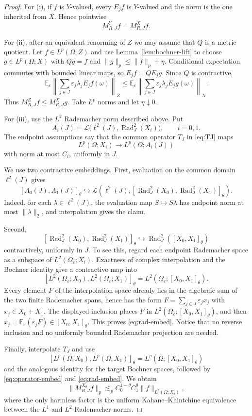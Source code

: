 \documentclass[11pt]{article}
\theoremstyle{definition}
\newcommand{\E}{\mathbb E}
\newcommand{\Rad}{\operatorname{Rad}}
\newcommand{\cL}{\mathcal L}
\newcommand{\1}{\mathbf 1}
\newcommand{\eps}{\varepsilon}
\begin{document}
\begin{proof}
For (i), if $f$ is $Y$-valued, every $E_jf$ is $Y$-valued and the norm is the
one inherited from $X$.  Hence pointwise
\[
 M_{R,J}^Yf=M_{R,J}^Xf.
\]

For (ii), after an equivalent renorming of $Z$ we may assume that $Q$ is a
metric quotient.  Let $f\in L^p(\Omega;Z)$ and use
Lemma~\ref{lem:bochner-lift} to choose $g\in L^p(\Omega;X)$ with $Qg=f$ and
$\|g\|_p\le\|f\|_p+\eta$.  Conditional expectation commutes with bounded
linear maps, so $E_jf=QE_jg$.  Since $Q$ is contractive,
\[
 \E_\eps\left\|\sum_{j\in J}\eps_j\lambda_jE_jf(\omega)\right\|_Z
 \le
 \E_\eps\left\|\sum_{j\in J}\eps_j\lambda_jE_jg(\omega)\right\|_X.
\]
Thus $M_{R,J}^Zf\le M_{R,J}^Xg$.  Take $L^p$ norms and let $\eta\downarrow0$.

For (iii), use the $L^2$ Rademacher norm described above.  Put
\[
 A_i(J)=\cL\bigl(\ell^2(J),\Rad_J^2(X_i)\bigr),\qquad i=0,1.
\]
The endpoint assumptions say that the common operator $T_J$ in
\eqref{eq:TJ} maps
\[
 L^p(\Omega;X_i)\longrightarrow L^p(\Omega;A_i(J))
\]
with norm at most $C_i$, uniformly in $J$.

We use two contractive embeddings.  First, evaluation on the common domain
$\ell^2(J)$ gives
\begin{equation}\label{eq:operator-embed}
 [A_0(J),A_1(J)]_\theta
 \hookrightarrow
 \cL\left(\ell^2(J),
 [\Rad_J^2(X_0),\Rad_J^2(X_1)]_\theta\right).
\end{equation}
Indeed, for each $\lambda\in\ell^2(J)$, the evaluation map $S\mapsto S\lambda$
has endpoint norm at most $\|\lambda\|_2$, and interpolation gives the claim.

Second,
\begin{equation}\label{eq:rad-embed}
 [\Rad_J^2(X_0),\Rad_J^2(X_1)]_\theta
 \hookrightarrow \Rad_J^2([X_0,X_1]_\theta)
\end{equation}
contractively, uniformly in $J$.  To see this, regard each endpoint Rademacher
space as a subspace of $L^2(\Omega_\eps;X_i)$.  Exactness of complex
interpolation and the Bochner identity give a contractive map into
\[
 [L^2(\Omega_\eps;X_0),L^2(\Omega_\eps;X_1)]_\theta
 =L^2(\Omega_\eps;[X_0,X_1]_\theta).
\]
Every element $F$ of the interpolation space already lies in the algebraic sum
of the two finite Rademacher spans, hence has the form
$F=\sum_{j\in J}\eps_jx_j$ with $x_j\in X_0+X_1$.  The displayed inclusion
places $F$ in $L^2(\Omega_\eps;[X_0,X_1]_\theta)$, and then
$x_j=\E_\eps(\eps_jF)\in[X_0,X_1]_\theta$.  This proves
\eqref{eq:rad-embed}.  Notice that no
reverse inclusion and no uniformly bounded Rademacher projection are needed.

Finally, interpolate $T_J$ and use
\[
 [L^p(\Omega;X_0),L^p(\Omega;X_1)]_\theta
 =L^p(\Omega;[X_0,X_1]_\theta)
\]
and the analogous identity for the target Bochner spaces, followed by
\eqref{eq:operator-embed} and \eqref{eq:rad-embed}.  We obtain
\[
 \|M_{R,J}^{X_\theta}f\|_p
 \lesssim_p C_0^{1-\theta}C_1^\theta
 \|f\|_{L^p(\Omega;X_\theta)},
\]
where the only harmless factor is the uniform Kahane--Khintchine equivalence
between the $L^1$ and $L^2$ Rademacher norms.
\end{proof}
\end{document}
